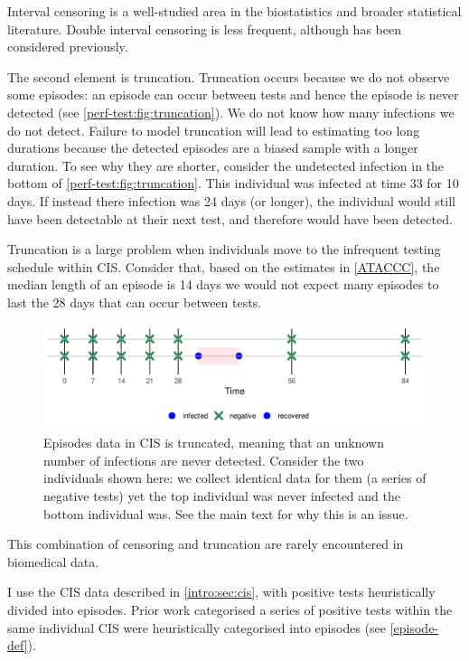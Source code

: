 \documentclass[main.tex]{subfiles}
\begin{document}
Interval censoring is a well-studied area in the biostatistics and broader statistical literature.
Double interval censoring is less frequent, although has been considered previously.

The second element is truncation.
Truncation occurs because we do not observe some episodes: an episode can occur between tests and hence the episode is never detected (see \autoref{perf-test:fig:truncation}).
We do not know how many infections we do not detect.
Failure to model truncation will lead to estimating too long durations because the detected episodes are a biased sample with a longer duration.
To see why they are shorter, consider the undetected infection in the bottom of \autoref{perf-test:fig:truncation}.
This individual was infected at time 33 for 10 days.
If instead there infection was 24 days (or longer), the individual would still have been detectable at their next test, and therefore would have been detected.

Truncation is a large problem when individuals move to the infrequent testing schedule within CIS.
Consider that, based on the estimates in \autoref{ATACCC}, the median length of an episode is 14 days  we would not expect many episodes to last the 28 days that can occur between tests.
\begin{figure}
  \centering \includegraphics{cis-perfect-testing/truncation}
  \caption{Episodes data in CIS is truncated, meaning that an unknown number of infections are never detected. Consider the two individuals shown here: we collect identical data for them (a series of negative tests) yet the top individual was never infected and the bottom individual was. See the main text for why this is an issue. \label{perf-test:fig:truncation}}
\end{figure}

This combination of censoring and truncation are rarely encountered in biomedical data. 

I use the CIS data described in \autoref{intro:sec:cis}, with positive tests heuristically divided into episodes.
Prior work categorised a series of positive tests within the same individual CIS were heuristically categorised into episodes (see \autoref{episode-def}).
\end{document}
